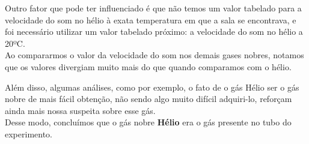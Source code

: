 Outro fator que pode ter influenciado é que não temos um valor tabelado para a velocidade do som no hélio à exata temperatura em que a sala se encontrava, e foi necessário utilizar um valor tabelado próximo: a velocidade do som no hélio a 20ºC.\\ 

Ao compararmos o valor da velocidade do som nos demais gases nobres, notamos que os valores divergiam muito mais do que quando comparamos com o hélio. 

Além disso, algumas análises, como por exemplo, o fato de o gás Hélio ser o gás nobre de mais fácil obtenção, não sendo algo muito difícil adquiri-lo, reforçam ainda mais nossa suspeita sobre esse gás.\\

Desse modo, concluímos que o gás nobre \textbf{Hélio} era o gás presente no tubo do experimento.

